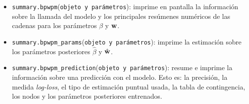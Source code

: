 \documentclass[../../Main/Main.tex]{subfiles}
\begin{document}
\begin{itemize}[label = {}]
	\item \verb|summary.bpwpm|(\verb|objeto y parámetros|): imprime en pantalla la información sobre la llamada del modelo y los principales resúmenes numéricos de las cadenas para los parámetros $\beta$ y $\mathbf{w}$.
	\item \verb|summary.bpwpm_params|(\verb|objeto y parámetros|): imprime la estimación sobre los parámetros posteriores $\hat{\beta}$ y $\hat{\mathbf{w}}$.
	\item \verb|summary.bpwpm_prediction|(\verb|objeto y parámetros|): resume e imprime la información sobre una predicción con el modelo. Esto es: la precisión, la medida \textit{log-loss}, el tipo de estimación puntual usada, la tabla de contingencia, los nodos y los parámetros posteriores entrenados. 
\end{itemize}
\end{document}
